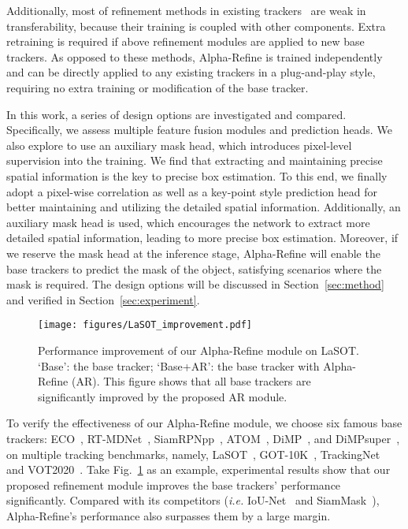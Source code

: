 \documentclass[final]{cvpr}
\begin{document}
Additionally, most of refinement methods in existing trackers~\cite{SPM,CascadedSiameseRPN,ATOM,DiMP} are weak in transferability,
because their training is coupled with other components. Extra retraining is required if above refinement modules are applied to new base trackers.
As opposed to these methods, Alpha-Refine is trained independently and can be directly applied to any existing trackers in a plug-and-play style, requiring no extra training or modification of the base tracker. 

In this work, a series of design options are investigated and compared. Specifically, we assess multiple feature fusion modules and prediction heads. We also explore to use an auxiliary mask head, which introduces pixel-level supervision into the training. We find that extracting and maintaining precise spatial information is the key to precise box estimation.
To this end, we finally adopt a pixel-wise correlation as well as a key-point style prediction head for better maintaining and utilizing the detailed spatial information. Additionally, an auxiliary mask head is used, which encourages the network to extract more detailed spatial information, leading to more precise box estimation.
Moreover, if we reserve the mask head at the inference stage, Alpha-Refine will enable the base trackers to predict the mask of the object, satisfying scenarios where the mask is required.
The design options will be discussed in Section~\ref{sec:method} and verified in Section~\ref{sec:experiment}. 

\begin{figure}[!t]
    \begin{center}
        \texttt{[image: figures/LaSOT\_improvement.pdf]}
        \end{center}
        \vspace{-2mm}
        \caption{Performance improvement of our Alpha-Refine module on LaSOT. 
        `Base': the base tracker; `Base+AR': the base tracker with Alpha-Refine (AR). This figure shows 
        that all base trackers are significantly improved by the proposed AR module.}
        \label{LaSOT_Improvement}
        \vspace{-2mm}
\end{figure}
To verify the effectiveness of our Alpha-Refine module, we choose six famous base trackers: ECO~\cite{ECO}, 
RT-MDNet~\cite{RTMDNet}, SiamRPNpp~\cite{SiamRPNplus}, ATOM~\cite{ATOM}, DiMP~\cite{DiMP}, and 
DiMPsuper~\cite{DiMP}, on multiple tracking benchmarks, namely, LaSOT~\cite{LaSOT}, GOT-10K~\cite{GOT10K}, TrackingNet~\cite{Trackingnet} and VOT2020~\cite{VOT2020}.
Take Fig.~\ref{LaSOT_Improvement} as an example, experimental results show that our proposed refinement module improves the base trackers' performance significantly. 
Compared with its competitors (\emph{i.e.} IoU-Net~\cite{ATOM,DiMP} and SiamMask~\cite{SiamMask}), Alpha-Refine's performance also surpasses them by a large margin. 
\end{document}
